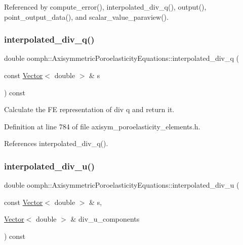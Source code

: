 Referenced by compute\+\_\+error(), interpolated\+\_\+div\+\_\+q(), output(), point\+\_\+output\+\_\+data(), and scalar\+\_\+value\+\_\+paraview().

\mbox{\label{classoomph_1_1AxisymmetricPoroelasticityEquations_a347ef10c5a8d90bae243072cc6b1510f}} 
\subsubsection{\texorpdfstring{interpolated\+\_\+div\+\_\+q()}{interpolated\_div\_q()}\hspace{0.1cm}{\footnotesize\ttfamily [2/2]}}
{\footnotesize\ttfamily double oomph\+::\+Axisymmetric\+Poroelasticity\+Equations\+::interpolated\+\_\+div\+\_\+q (\begin{DoxyParamCaption}\item[{const \hyperlink{classoomph_1_1Vector}{Vector}$<$ double $>$ \&}]{s }\end{DoxyParamCaption}) const\hspace{0.3cm}{\ttfamily [inline]}}



Calculate the FE representation of div q and return it. 



Definition at line 784 of file axisym\+\_\+poroelasticity\+\_\+elements.\+h.



References interpolated\+\_\+div\+\_\+q().

\mbox{\label{classoomph_1_1AxisymmetricPoroelasticityEquations_a45820f816533341e6def9edf32fcc055}} 
\subsubsection{\texorpdfstring{interpolated\+\_\+div\+\_\+u()}{interpolated\_div\_u()}}
{\footnotesize\ttfamily double oomph\+::\+Axisymmetric\+Poroelasticity\+Equations\+::interpolated\+\_\+div\+\_\+u (\begin{DoxyParamCaption}\item[{const \hyperlink{classoomph_1_1Vector}{Vector}$<$ double $>$ \&}]{s,  }\item[{\hyperlink{classoomph_1_1Vector}{Vector}$<$ double $>$ \&}]{div\+\_\+u\+\_\+components }\end{DoxyParamCaption}) const\hspace{0.3cm}{\ttfamily [inline]}}

